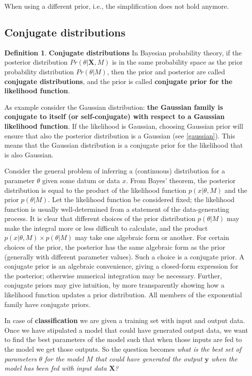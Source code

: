 \documentclass[12pt, letterpaper]{article}
\theoremstyle{definition}
\newtheorem{definition}{Definition}[section]
\newcommand{\X}{\mathrm{\mathbf{X}}}
\newcommand{\y}{\mathbf{y}}
\begin{document}
When using a different prior, i.e., the simplification does not hold anymore.

\subsection{Conjugate distributions}
\label{conjugacy}
\begin{definition}{\textbf{Conjugate distributions}}
In Bayesian probability theory, if the posterior distribution $Pr(\theta|\X,M)$ is in the same probability space as the prior probability distribution $Pr(\theta|M)$, then the prior and posterior are called \textbf{conjugate distributions}, and the prior is called \textbf{conjugate prior for the likelihood function}. 
\end{definition}

As example consider the Gaussian distribution: \textbf{the Gaussian family is conjugate to itself (or self-conjugate) with respect to a Gaussian likelihood function}. If the likelihood is Gaussian, choosing Gaussian prior will ensure that also the posterior distribution is a Gaussian (see \ref{gaussian}). This means that the Gaussian distribution is a conjugate prior for the likelihood that is also Gaussian.

Consider the general problem of inferring a (continuous) distribution for a parameter $\theta$ given some datum or data $x$. From Bayes' theorem, the posterior distribution is equal to the product of the likelihood function $p(x|\theta, M)$ and the prior $p(\theta|M)$. Let the likelihood function be considered fixed; the likelihood function is usually well-determined from a statement of the data-generating process. It is clear that different choices of the prior distribution $p(\theta|M)$ may make the integral more or less difficult to calculate, and the product $p(x|\theta,M) \times p(\theta|M)$ may take one algebraic form or another. For certain choices of the prior, the posterior has the same algebraic form as the prior (generally with different parameter values). Such a choice is a conjugate prior. A conjugate prior is an algebraic convenience, giving a closed-form expression for the posterior; otherwise numerical integration may be necessary. Further, conjugate priors may give intuition, by more transparently showing how a likelihood function updates a prior distribution.
All members of the exponential family have conjugate priors.

In case of \textbf{classification} we are given a training set with input and output data. Once we have stipulated a model that could have generated output data, we want to find the best parameters of the model such that when those inputs are fed to the model we get those outputs. So the question becomes \textit{what is the best set of parameters $\theta$ for the model $M$ that could have generated the output $\y$ when the model has been fed with input data $\X$?}
\end{document}
